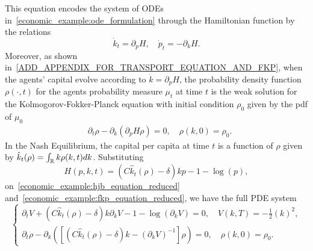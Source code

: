 This equation encodes the system of ODEs in~\ref{economic_example:ode_formulation} through the Hamiltonian function by the relations
\begin{equation*}
    \dot k_t = \partial_p H,\quad \dot p_t = -\partial_k H.
\end{equation*}
Moreover, as shown in~\ref{ADD_APPENDIX_FOR_TRANSPORT_EQUATION_AND_FKP},
when the agents' capital evolve according to $\dot k = \partial_p H$,
the probability density function $\rho(\cdot, t)$ for the agents probability measure $\mu_t$ at time $t$
is the weak solution for the Kolmogorov-Fokker-Planck equation with initial condition $\rho_0$ given by the pdf of $\mu_0$
\begin{equation}\label{economic_example:fkp_equation_reduced}
\begin{split}
    &\partial_t \rho - \partial_k \left( \partial_p H \rho \right) = 0, \quad\rho(k,0) = \rho_0.
\end{split}
\end{equation}
In the Nash Equilibrium, the capital per capita at time $t$ is a function of $\rho$ given by $\hat k_t(\rho) = \int_{\mathbb{R}} k \rho(k,t) dk$.
Substituting 
\begin{equation*}
    H(p,k,t) = \left(C {\hat k_t(\rho) - \delta}\right)k p  - 1  - \log(p),
\end{equation*}
on~\ref{economic_example:hjb_equation_reduced} and~\ref{economic_example:fkp_equation_reduced}, we have the full PDE system
\begin{equation}
    \begin{cases}
        \partial_t V +  \left(C {\hat k_t(\rho) - \delta}\right)k\partial_k V - 1  - \log(\partial_k V) = 0,  \quad V(k,T) = -\frac{1}{2}{(k)}^2,\\
        \partial_t \rho - \partial_k \left( \left[ \left(C {\hat k_t}(\rho) - \delta\right) k - {(\partial_k V)}^{-1} \right]\rho \right) = 0, \quad \rho(k,0) = \rho_0.
    \end{cases}
\end{equation}
\color{black}


